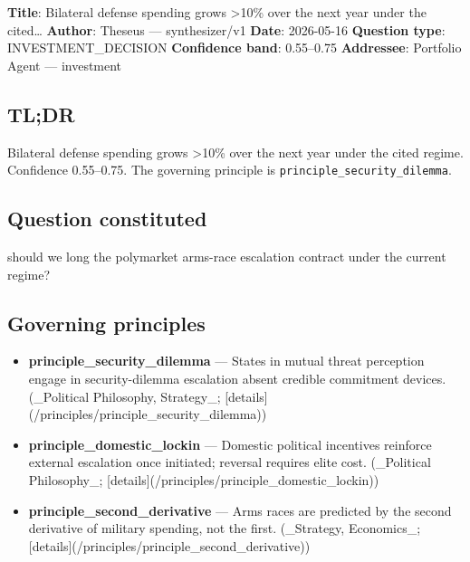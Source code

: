 %
%
\textbf{Title}: Bilateral defense spending grows >10\% over the next year under the cited…
\textbf{Author}: Theseus — synthesizer/v1
\textbf{Date}: 2026-05-16
\textbf{Question type}: INVESTMENT\_DECISION
\textbf{Confidence band}: 0.55–0.75
\textbf{Addressee}: Portfolio Agent — investment

\subsection*{TL;DR}
Bilateral defense spending grows >10\% over the next year under the cited regime. Confidence 0.55–0.75. The governing principle is \texttt{principle\_security\_dilemma}.

\subsection*{Question constituted}
should we long the polymarket arms-race escalation contract under the current regime?

\subsection*{Governing principles}
\begin{itemize}
\item \textbf{principle\_security\_dilemma} — States in mutual threat perception engage in security-dilemma escalation absent credible commitment devices. (\_Political Philosophy, Strategy\_; [details](/principles/principle\_security\_dilemma))
\item \textbf{principle\_domestic\_lockin} — Domestic political incentives reinforce external escalation once initiated; reversal requires elite cost. (\_Political Philosophy\_; [details](/principles/principle\_domestic\_lockin))
\item \textbf{principle\_second\_derivative} — Arms races are predicted by the second derivative of military spending, not the first. (\_Strategy, Economics\_; [details](/principles/principle\_second\_derivative))
\end{itemize}

